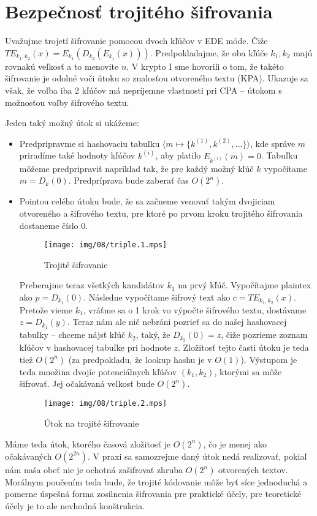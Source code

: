 \section{Bezpečnosť trojitého šifrovania}

Uvažujme trojetí šifrovanie pomocou dvoch kľúčov v EDE móde.
Čiže $TE_{k_1,k_2} (x) = E_{k_1}(D_{k_2}(E_{k_1}(x)))$.
Predpokladajme, že oba kľúče $k_1, k_2$ majú rovnakú veľkosť a to
menovite $n$.
V krypto I sme hovorili o tom, že takéto šifrovanie je odolné voči
útoku so znalosťou otvoreného textu (KPA).
Ukazuje sa však, že voľba iba 2 kľúčov má nepríjemne vlastnosti pri
CPA -- útokom s možnosťou voľby šifrového textu.

Jeden taký možný útok si ukážeme:
\begin{itemize}
    \item Predpripravme si hashovaciu tabuľku
            $\langle m \mapsto \{k^{(1)}, k^{(2)}, \dots \} \rangle$,
            kde správe $m$ priradíme také hodnoty kľúčov $k^{(i)}$,
            aby platilo $E_{k^{(i)}}(m)=0$.
        Tabuľku môžeme predpripraviť napríklad tak, že pre každý možný
        kľúč $k$ vypočítame $m=D_k(0)$. Predpríprava bude zaberať čas
        $O(2^n)$.
    \item Pointou celého útoku bude, že sa začneme venovať takým
        dvojiciam otvoreného a šifrového textu, pre ktoré po prvom kroku
        trojitého šifrovania dostaneme číslo 0.
        \begin{figure}[h]
            \centering
            \texttt{[image: img/08/triple.1.mps]}
            \caption{Trojité šifrovanie}
            \label{fig:triple}
        \end{figure}
        Preberajme teraz všetkých kandidátov $k_1$ na prvý kľúč.
        Vypočítajme plaintex ako $p=D_{k_1}(0)$.
        Následne vypočítame šifrový text ako $c=TE_{k_1,k_2}(x)$.
        Pretože vieme $k_1$, vráťme sa o 1 krok vo výpočte šifrového
        textu, dostávame $z=D_{k_1}(y)$.
        Teraz nám ale nič nebráni pozrieť sa do našej hashovacej
        tabuľky -- chceme nájsť kľúč $k_2$, taký, že
        $D_{k_2}(0) = z$, čiže pozrieme zoznam kľúčov v hashovacej
        tabuľke pri hodnote $z$.
        Zložitosť tejto časti útoku je teda tiež $O(2^n)$ (za
        predpokladu, že lookup hashu je v $O(1)$).
        Výstupom je teda množina dvojíc potenciálnych kľúčov
        $(k_1,k_2)$, ktorými sa môže šifrovať.
        Jej očakávaná veľkosť bude $O(2^n)$.
        \begin{figure}[h]
            \centering
            \texttt{[image: img/08/triple.2.mps]}
            \caption{Útok na trojité šifrovanie}
            \label{fig:triple-attack}
        \end{figure}
\end{itemize}
Máme teda útok, ktorého časová zložitosť je $O(2^n)$, čo je menej ako
očakávaných $O(2^{2n})$. V praxi sa samozrejme daný útok nedá
realizovať, pokiaľ nám naša obeť nie je ochotná zašifrovať zhruba
$O(2^n)$ otvorených textov. Morálnym poučením teda bude, že trojité
kódovanie môže byť síce jednoduchá a pomerne úspešná forma zosilnenia
šifrovania pre praktické účely, pre teoretické účely je to ale
nevhodná konštrukcia.
